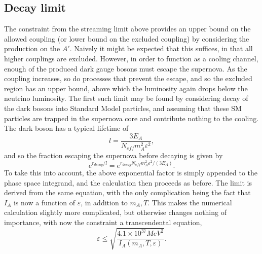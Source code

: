 \documentclass[nofootinbib,prd,superscriptaddress,twocolumn]{revtex4}
\newcommand{\beq}{\begin{equation}}
\newcommand{\eeq}{\end{equation}}
\begin{document}
\subsection{Decay limit}
The constraint from the streaming limit above provides an upper bound on the allowed coupling (or lower bound on the excluded coupling) by considering the production on the $A'$. Naively it might be expected that this suffices, in that all higher couplings are excluded. However, in order to function as a cooling channel, enough of the produced dark gauge bosons must escape the supernova. As the coupling increases, so do processes that prevent the escape, and so the excluded region has an upper bound, above which the luminosity again drops below the neutrino luminosity. The first such limit may be found by considering decay of the dark bosons into Standard Model particles, and assuming that these SM particles are trapped in the supernova core and contribute nothing to the cooling. The dark boson has a typical lifetime of 
\beq
l = \frac{3 E_{A}}{N_{eff} m_A^2 \varepsilon^2},
\eeq
and so the fraction escaping the supernova before decaying is given by 
\beq
e^{r_{decay}/l} = e^{r_{decay} N_{eff} m_A^2 \varepsilon^2/(3 E_A)}.
\eeq
To take this into account, the above exponential factor is simply appended to the phase space integrand, and the calculation then proceeds as before. The limit is derived from the same equation, with the only complication being the fact that $ I_A $ is now a function of $ \varepsilon $, in addition to $ m_A, T $. This makes the numerical calculation slightly more complicated, but otherwise changes nothing of importance, with now the constraint a transcendental equation,  
\beq
\varepsilon \le \sqrt{\frac{4.1 \times 10^{37} MeV^2}{I_A(m_A, T, \varepsilon)}}.
\eeq
	
	
\end{document}
